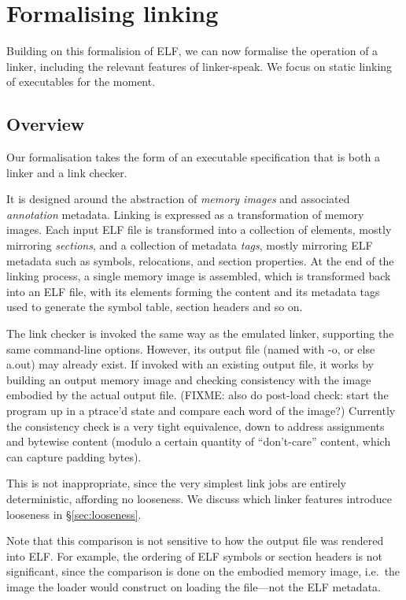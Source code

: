 \section{Formalising linking}

Building on this formalision of ELF, we can now formalise the operation of a linker,
including the relevant features of linker-speak.
We focus on static linking of executables for the moment.

\subsection{Overview}

Our formalisation takes the form of an executable specification that 
is both a linker and a link checker.

It is designed around the abstraction of \emph{memory images} and associated \emph{annotation} metadata.
Linking is expressed as a transformation of memory images.
Each input ELF file is transformed into a collection of elements, mostly mirroring \emph{sections},
and a collection of metadata \emph{tags}, mostly mirroring ELF metadata such as 
symbols, relocations, and section properties.
At the end of the linking process, a single memory image is assembled,
which is transformed back into an ELF file, with its elements
forming the content and its metadata tags used to generate the symbol table, section headers
and so on.

The link checker is invoked the same way as the emulated linker, supporting the same command-line options.
However, its output file (named with \textsf{-o}, or else \textsf{a.out}) may already exist.
If invoked with an existing output file,
it works by building an output memory image and checking consistency with the image
embodied by the actual output file.
(FIXME: also do post-load check: start the program up in a ptrace'd state 
and compare each word of the image?)
Currently the consistency check is a very tight equivalence, down to address assignments and bytewise content
(modulo a certain quantity of ``don't-care'' content, which can capture padding bytes).

This is not inappropriate, since the very simplest link jobs are entirely deterministic, 
affording no looseness.
We discuss which linker features introduce looseness in \S\ref{sec:looseness}.

Note that this comparison is not sensitive to how the output file was rendered into ELF.
For example, the ordering of ELF symbols or section headers is not significant, since 
the comparison is done on the embodied memory image, i.e.\ the image the loader
would construct on loading the file---not the ELF metadata.

